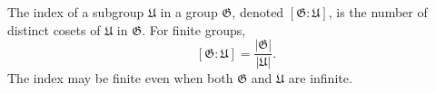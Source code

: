 The index of a subgroup $\mathfrak{U}$ in a group $\mathfrak{G}$, denoted $[\mathfrak{G} : \mathfrak{U}]$, is the number of distinct cosets of $\mathfrak{U}$ in $\mathfrak{G}$. For finite groups,
$$[\mathfrak{G} : \mathfrak{U}] = \frac{|\mathfrak{G}|}{|\mathfrak{U}|}.$$
The index may be finite even when both $\mathfrak{G}$ and $\mathfrak{U}$ are infinite.
